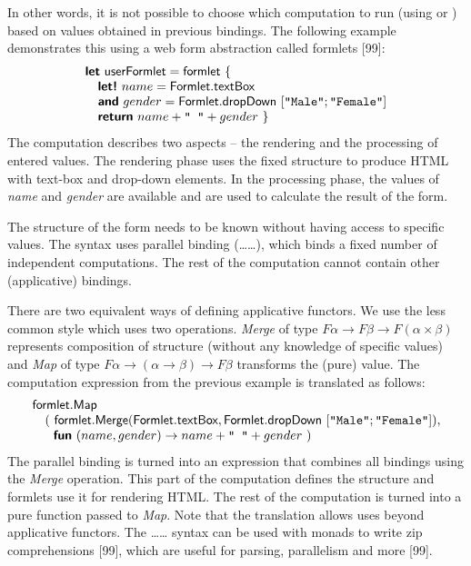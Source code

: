 \documentclass[runningheads,a4paper]{llncs}
\begin{document}
In other words, it is not possible to choose which computation to run (using  or 
) based on values obtained in previous  bindings. The following example
demonstrates this using a web form abstraction called formlets [99]:
%
\vspace{-0.3em}
\begin{equation*}
\begin{array}{l}
\kvd{let}~\ident{userFormlet} = \ident{formlet}~\{\\
\quad \kvd{let!}~name = \ident{Formlet}.\ident{textBox} \\
\quad \kvd{and}~gender = \ident{Formlet}.\ident{dropDown}~[\texttt{"Male"}; \texttt{"Female"}] \\
\quad \kvd{return}~name + \texttt{" "} + gender ~\}
\end{array}
\vspace{-0.3em}
\end{equation*}
%
The computation describes two aspects -- the rendering and the processing of entered values.
The rendering phase uses the fixed structure to produce HTML with text-box and drop-down elements.
In the processing phase, the values of \emph{name} and \emph{gender} are available and are used to
calculate the result of the form.

The structure of the form needs to be known without having access to specific values. The syntax
uses parallel binding (\ldots{}\ldots), which binds a fixed number of independent
computations. The rest of the computation cannot contain other (applicative) bindings.

There are two equivalent ways of defining applicative functors. We use the less common style
which uses two operations. \emph{Merge} of type $F\alpha \rightarrow F\beta \rightarrow F(\alpha \times \beta)$
represents composition of structure (without any knowledge of specific values) and \emph{Map} of 
type $F\alpha \rightarrow (\alpha \rightarrow \beta) \rightarrow F\beta$ transforms the (pure) value.
The computation expression from the previous example is translated as follows:
%
\vspace{-0.3em}
\begin{equation*}
\begin{array}{l}
\ident{formlet}.\ident{Map} \\
\quad (~\ident{formlet}.\ident{Merge}(\ident{Formlet}.\ident{textBox}, 
  \ident{Formlet}.\ident{dropDown}~[\texttt{"Male"}; \texttt{"Female"}]),  \\
\quad~~\kvd{fun}~(name, gender) \rightarrow name + \texttt{" "} + gender~)
\end{array}
\vspace{-0.3em}
\end{equation*}
%
The parallel binding is turned into an expression that combines all bindings using the 
\emph{Merge} operation. This part of the computation defines the structure and formlets use it
for rendering HTML. The rest of the computation is turned into a pure function passed to \emph{Map}.
Note that the translation allows uses beyond applicative functors. The \ldots{}\ldots
syntax can be used with monads to write zip comprehensions [99], which are useful for
parsing, parallelism and more [99].
\end{document}
